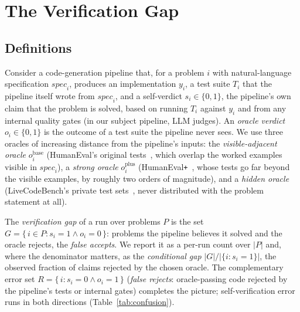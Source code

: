 \section{The Verification Gap}
\label{sec:gap}


\subsection{Definitions}

Consider a code-generation pipeline that, for a problem $i$ with natural-language
specification $\mathit{spec}_i$, produces an implementation $y_i$, a test suite $T_i$ that the
pipeline itself wrote from $\mathit{spec}_i$, and a self-verdict
$s_i \in \{0,1\}$, the pipeline's own claim that the problem is solved, based on running
$T_i$ against $y_i$ and from any internal quality gates (in our subject pipeline, LLM judges).
An \emph{oracle verdict} $o_i \in \{0,1\}$ is the outcome of a test suite the pipeline never
sees. We use three oracles of increasing distance from the pipeline's inputs: the
\emph{visible-adjacent oracle} $o^{\mathrm{base}}_i$ (HumanEval's original tests~\cite{chen2021humaneval}, which
overlap the worked examples visible in $\mathit{spec}_i$), a \emph{strong oracle}
$o^{\mathrm{plus}}_i$ (HumanEval\texttt{+}~\cite{liu2023evalplus}, whose tests go far beyond
the visible examples, by roughly two orders of magnitude), and a \emph{hidden oracle}
(LiveCodeBench's private test sets~\cite{jain2024livecodebench}, never distributed with the
problem statement at all).

The \emph{verification gap} of a run over problems $P$ is the set
$G = \{\, i \in P : s_i = 1 \wedge o_i = 0 \,\}$: problems the pipeline believes it solved and
the oracle rejects, the \emph{false accepts}. We report it as a per-run count over $|P|$ and,
where the denominator matters, as the \emph{conditional gap} $|G| / |\{ i : s_i = 1 \}|$, the
observed fraction of claims rejected by the chosen oracle. The complementary error set
$R = \{\, i : s_i = 0 \wedge o_i = 1 \,\}$ (\emph{false rejects}: oracle-passing code rejected by the
pipeline's tests or internal gates) completes the picture; self-verification error runs in both directions
(Table~\ref{tab:confusion}).

